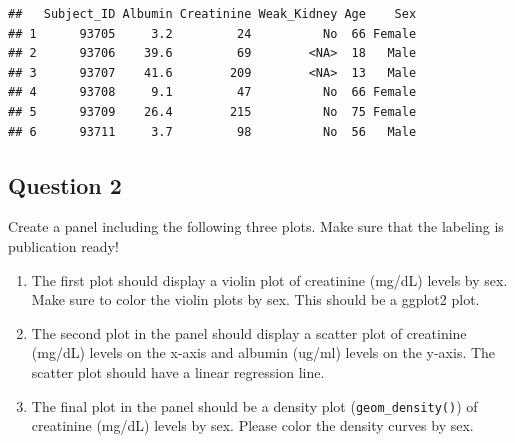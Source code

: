 \documentclass[
]{article}
\providecommand{\tightlist}{%
  \setlength{\itemsep}{0pt}\setlength{\parskip}{0pt}}
\begin{document}
\begin{verbatim}
##   Subject_ID Albumin Creatinine Weak_Kidney Age    Sex
## 1      93705     3.2         24          No  66 Female
## 2      93706    39.6         69        <NA>  18   Male
## 3      93707    41.6        209        <NA>  13   Male
## 4      93708     9.1         47          No  66 Female
## 5      93709    26.4        215          No  75 Female
## 6      93711     3.7         98          No  56   Male
\end{verbatim}

\subsection{Question 2}\label{question-2}

Create a panel including the following three plots. Make sure that the
labeling is publication ready!

\begin{enumerate}
\def\labelenumi{\alph{enumi})}
\tightlist
\item
  The first plot should display a violin plot of creatinine (mg/dL)
  levels by sex. Make sure to color the violin plots by sex. This should
  be a ggplot2 plot.
\item
  The second plot in the panel should display a scatter plot of
  creatinine (mg/dL) levels on the x-axis and albumin (ug/ml) levels on
  the y-axis. The scatter plot should have a linear regression line.
\item
  The final plot in the panel should be a density plot
  (\texttt{geom\_density()}) of creatinine (mg/dL) levels by sex. Please
  color the density curves by sex.
\end{enumerate}
\end{document}
